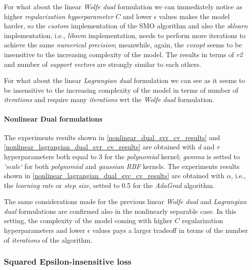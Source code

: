 

For what about the linear \emph{Wolfe dual} formulation we can immediately notice as higher \emph{regularization hyperparameter} $C$ and lower $\epsilon$ values makes the model harder, so the \emph{custom} implementation of the SMO algorithm and also the \emph{sklearn} implementation, i.e., \emph{libsvm} \cite{chang2011libsvm} implementation, needs to perform more iterations to achieve the same \emph{numerical precision}; meanwhile, again, the \emph{cvxopt} \cite{vandenberghe2010cvxopt} seems to be insensitive to the increasing complexity of the model. The results in terms of \emph{r2} and number of \emph{support vectors} are strongly similar to each others.



For what about the linear \emph{Lagrangian dual} formulation we can see as it seems to be insensitive to the increasing complexity of the model in terms of number of \emph{iterations} and require many \emph{iterations} wrt the \emph{Wolfe dual} formulation.

\paragraph{Nonlinear Dual formulations}

The experiments results shown in \ref{nonlinear_dual_svr_cv_results} and \ref{nonlinear_lagrangian_dual_svr_cv_results} are obtained with \emph{d} and \emph{r} hyperparameters both equal to 3 for the \emph{polynomial} kernel; \emph{gamma} is setted to \emph{`scale`} for both \emph{polynomial} and \emph{gaussian RBF} kernels. The experiments results shown in \ref{nonlinear_lagrangian_dual_svc_cv_results} are obtained with $\alpha$, i.e., the \emph{learning rate} or \emph{step size}, setted to 0.5 for the \emph{AdaGrad} algorithm.





The same considerations made for the previous linear \emph{Wolfe dual} and \emph{Lagrangian dual} formulations are confirmed also in the nonlinearly separable case. In this setting, the complexity of the model coming with higher $C$ regularization hyperparameters and lower $\epsilon$ values pays a larger tradeoff in terms of the number of \emph{iterations} of the algorithm.

\subsubsection{Squared Epsilon-insensitive loss}

